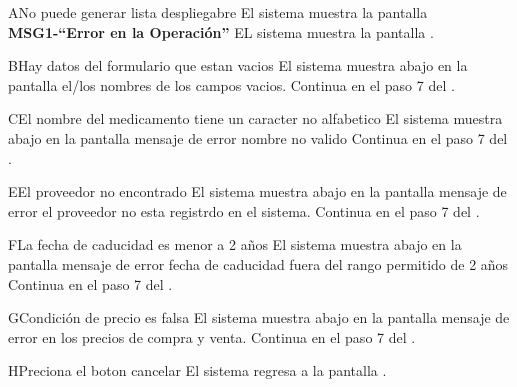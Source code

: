 	    \begin{UCtrayectoriaA}{A}{No puede generar lista despliegabre}
			\UCpaso El sistema muestra la pantalla {\bf MSG1-``Error en la Operación''}
			\UCpaso EL sistema muestra la pantalla .
		\end{UCtrayectoriaA}
		\begin{UCtrayectoriaA}{B}{Hay datos del formulario que estan vacios}
			\UCpaso El sistema muestra abajo en la pantalla el/los nombres de los campos vacios.
			\UCpaso Continua en el paso 7 del .
		\end{UCtrayectoriaA}		
		\begin{UCtrayectoriaA}{C}{El nombre del medicamento tiene un caracter no alfabetico}
			\UCpaso El sistema muestra abajo en la pantalla mensaje de error nombre no valido
			\UCpaso Continua en el paso 7 del .
		\end{UCtrayectoriaA}
		\begin{UCtrayectoriaA}{E}{El proveedor no encontrado}
			\UCpaso El sistema muestra abajo en la pantalla mensaje de error el proveedor no esta registrdo en el sistema.
			\UCpaso Continua en el paso 7 del .
		\end{UCtrayectoriaA}
		\begin{UCtrayectoriaA}{F}{La fecha de caducidad es menor a 2 años}
			\UCpaso El sistema muestra abajo en la pantalla mensaje de error fecha de caducidad fuera del rango permitido de 2 años
			\UCpaso Continua en el paso 7 del .
		\end{UCtrayectoriaA}
		\begin{UCtrayectoriaA}{G}{Condición de precio es falsa}
			\UCpaso El sistema muestra abajo en la pantalla mensaje de error en los precios de compra y venta.
			\UCpaso Continua en el paso 7 del .
		\end{UCtrayectoriaA}
		\begin{UCtrayectoriaA}{H}{Preciona el boton cancelar}
				\UCpaso El sistema regresa a la pantalla  .
		\end{UCtrayectoriaA}		